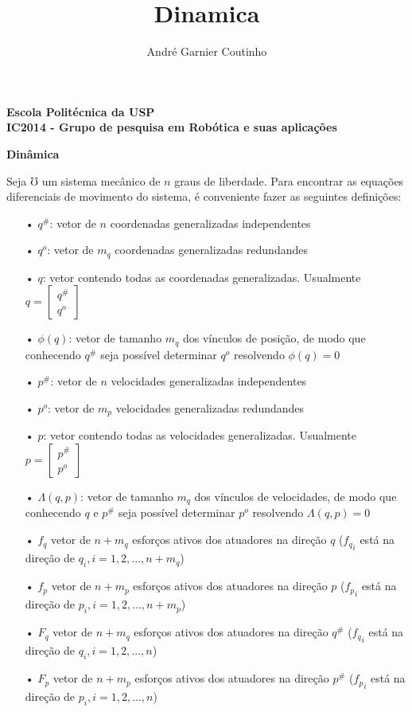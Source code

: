 \documentclass[12pt,a4paper]{article}
\title{Dinamica}
\author{André Garnier Coutinho}
\begin{document}
\begin{center}
\textbf{Escola Politécnica da USP\\
IC2014 - Grupo de pesquisa em Robótica e suas aplicações\\}
\end{center}

\begin{center}
\textbf{Dinâmica}
\end{center}


Seja $\mho$ um sistema mecânico de $n$ graus de liberdade. Para encontrar as equações diferenciais de movimento do sistema, é conveniente fazer as seguintes definições:

\begin{itemize}
\item[•]$q^{\#}$: vetor de $n$ coordenadas generalizadas independentes
\item[•]$q^o$: vetor de $m_q$ coordenadas generalizadas redundandes
\item[•]$q$: vetor contendo todas as coordenadas generalizadas. Usualmente $q = \begin{bmatrix} q^{\#} \\q^o \end{bmatrix} $
\item[•]$\phi(q)$: vetor de tamanho $m_q$ dos vínculos de posição, de modo que conhecendo $q^{\#}$ seja possível determinar $q^o$ resolvendo $\phi(q) = 0$
\item[•]$p^{\#}$: vetor de $n$ velocidades generalizadas independentes
\item[•]$p^o$: vetor de $m_p$ velocidades generalizadas redundandes
\item[•]$p$: vetor contendo todas as velocidades generalizadas. Usualmente $p = \begin{bmatrix} p^{\#} \\p^o \end{bmatrix} $
\item[•]$\Lambda(q,p)$: vetor de tamanho $m_q$ dos vínculos de velocidades, de modo que conhecendo $q$ e $p^{\#}$ seja possível determinar $p^o$ resolvendo $\Lambda(q,p) = 0$
\item[•]$f_q$ vetor de $n+m_q$ esforços ativos dos atuadores na direção $q$ (${f_q}_i$ está na direção de $q_i, i = 1,2,...,n+m_q$)
\item[•]$f_p$ vetor de $n+m_p$ esforços ativos dos atuadores na direção $p$ (${f_p}_i$ está na direção de $p_i, i = 1,2,...,n+m_p$)
\item[•]$F_q$ vetor de $n+m_q$ esforços ativos dos atuadores na direção $q^{\#}$ (${f_q}_i$ está na direção de $q_i, i = 1,2,...,n$)
\item[•]$F_p$ vetor de $n+m_p$ esforços ativos dos atuadores na direção $p^{\#}$ (${f_p}_i$ está na direção de $p_i, i = 1,2,...,n$)
\end{itemize}
\end{document}
